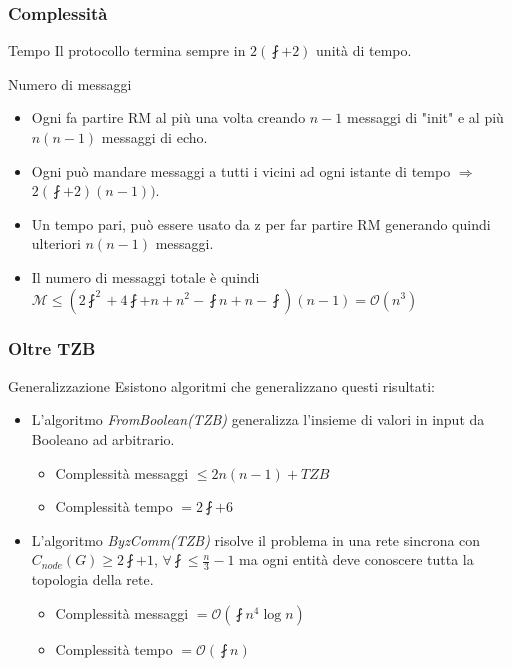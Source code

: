 		\begin{frame}
			\frametitle{Complessità}
			\begin{block}{Tempo}
				Il protocollo termina sempre in $2(\fint + 2)$ unità di tempo.
			\end{block}
			\begin{block}{Numero di messaggi}
				\begin{itemize}
					\item Ogni \nguasta fa partire RM al più una volta creando $n - 1$ messaggi di "init" e al più $n(n-1)$ messaggi di echo.
					\item Ogni \guasta può mandare messaggi a tutti i vicini ad ogni istante di tempo $\Rightarrow$ $2(\fint + 2)(n-1))$.
					\item Un tempo pari, può essere usato da z per far partire RM generando quindi ulteriori $n(n-1)$ messaggi.
					\item Il numero di messaggi totale è quindi $\mathcal{M}\leq (2\fint^2 + 4\fint + n + n^2 - \fint n + n - \fint)(n-1) = \mathcal{O}(n^3)$
				\end{itemize}			
			\end{block}
		\end{frame}
	
		\begin{frame}
			\frametitle{Oltre TZB}
			\begin{block}{Generalizzazione}
				Esistono algoritmi che generalizzano questi risultati:
				\begin{itemize}
					\item L'algoritmo \emph{FromBoolean(TZB)} generalizza l'insieme di valori in input da Booleano ad arbitrario.
					\begin{itemize}
						\footnotesize
						\item Complessità messaggi $\leq 2n(n-1) + TZB$
						\item Complessità tempo $= 2\fint + 6$
					\end{itemize}
					\item L'algoritmo \emph{ByzComm(TZB)} risolve il problema in una rete sincrona con $C_{node}(G) \geq 2\fint + 1$, $\forall \fint \leq \frac{n}{3} - 1$ ma ogni entità deve conoscere tutta la topologia della rete.
					\begin{itemize}
						\footnotesize
						\item Complessità messaggi $= \mathcal{O}(\fint n^4 \log n)$
						\item Complessità tempo $= \mathcal{O}(\fint n)$
					\end{itemize}
				\end{itemize}
			\end{block}		
		\end{frame}

